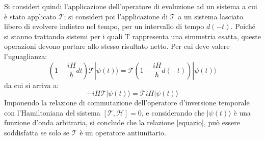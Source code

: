 Si consideri quindi l'applicazione dell'operatore di evoluzione ad un sistema a cui è stato applicato $\mathscr{T}$; si consideri poi l'applicazione di $\mathscr{T}$ a un sistema lasciato  libero di evolvere indietro nel tempo, per un intervallo di tempo $d(-t)$.
Poich\'e si stanno trattando sistemi per i quali T rappresenta una simmetria esatta, queste operazioni devono portare allo stesso risultato netto. Per cui deve valere l'uguaglianza:
\begin{equation}
 (1-\frac{iH}{\hbar}dt)\mathscr{T}|\psi(t)\rangle = \mathscr{T}(1-\frac{iH}{\hbar}d(-t))|\psi(t)\rangle
\end{equation}
da cui si arriva a:
\begin{equation}\label{equazio}
 -iH\mathscr{T}|\psi(t)\rangle =  \mathscr{T}iH|\psi(t)\rangle
\end{equation}
Imponendo la relazione di commutazione dell'operatore d'inversione temporale con l'Hamiltoniana del sistema $[\mathscr{T},\mathscr{H}] = 0$, e considerando che $|\psi(t)\rangle$ \`e una funzione d'onda arbitraria, si conclude che la relazione \eqref{equazio}, pu\`o essere soddisfatta se solo se $\mathscr{T}$ \`e un operatore antiunitario\cite{BigiSanda}.

